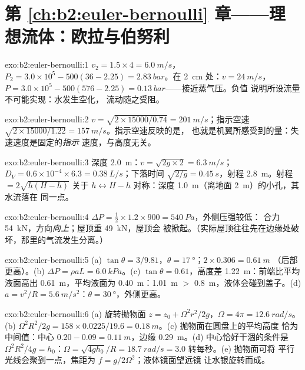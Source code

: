 \section*{第 \ref{ch:b2:euler-bernoulli} 章——理想流体：欧拉与伯努利}

\begin{solution}{exo:b2:euler-bernoulli:1}
$v_2 = 1.5 \times 4 = \qty{6.0}{m/s}$，$P_2 = 3.0 \times 10^5 - 500(36 - 2.25) =
\qty{2.83}{bar}$。在 \qty{2}{cm} 处：$v = \qty{24}{m/s}$，$P = 3.0 \times 10^5 - 500
(576 - 2.25) = \qty{0.13}{bar}$——接近蒸气压。负值
说明所设流量不可能实现：水发生空化，
流动随之受阻。
\end{solution}

\begin{solution}{exo:b2:euler-bernoulli:2}
$v = \sqrt{2 \times 15000/0.74} = \qty{201}{m/s}$；指示空速 $\sqrt{2 \times 15000/
1.22} = \qty{157}{m/s}$。指示空速反映的是，
也就是机翼所感受到的量：失速速度是固定的\emph{指示}
速度，与高度无关。
\end{solution}

\begin{solution}{exo:b2:euler-bernoulli:3}
深度 \qty{2.0}{m}：$v = \sqrt{2g \times 2} = \qty{6.3}{m/s}$；$D_V = 0.6 \times 10^{-4}
\times 6.3 = \qty{0.38}{L/s}$；下落时间 $\sqrt{2/g} = \qty{0.45}{s}$，射程
\qty{2.8}{m}。射程 $= 2\sqrt{h(H - h)}$ 关于 $h \leftrightarrow H -
h$ 对称：深度 \qty{1.0}{m}（离地面 \qty{2}{m}）的小孔，其水流落在
同一点。
\end{solution}

\begin{solution}{exo:b2:euler-bernoulli:4}
$\Delta P = \tfrac12 \times 1.2 \times 900 = \qty{540}{Pa}$，外侧压强较低：
合力 \qty{54}{kN}，方向\emph{向上}；屋顶重 \qty{49}{kN}，屋顶会
被掀起。（实际屋顶往往先在边缘处破坏，那里的气流发生分离。）
\end{solution}

\begin{solution}{exo:b2:euler-bernoulli:5}
(a) $\tan\theta = 3/9.81$，$\theta = \qty{17}{\degree}$；$2 \times 0.306 = \qty{0.61}{m}$
（后部更高）。(b) $\Delta P = \rho aL = \qty{6.0}{kPa}$。(c) $\tan\theta =
0.61$，高度差 \qty{1.22}{m}：前端比平均液面高出
\qty{0.61}{m}，平均液面为 \qty{0.40}{m}：\qty{1.01}{m} $>$ \qty{0.8}{m}，液体会碰到盖子。(d) $a = v^2/R =
\qty{5.6}{m/s^2}$：$\theta = \qty{30}{\degree}$，外侧更高。
\end{solution}

\begin{solution}{exo:b2:euler-bernoulli:6}
(a) 旋转抛物面 $z = z_0 + \Omega^2r^2/2g$，$\Omega = 4\pi = \qty{12.6}{rad/s}$。(b)
$\Omega^2R^2/2g = 158 \times 0.0225/19.6 = \qty{0.18}{m}$。(c) 抛物面在圆盘上的平均高度
恰为中间值：中心 $0.20 - 0.09 = \qty{0.11}{m}$，边缘
\qty{0.29}{m}。(d) 中心恰好干涸的条件是 $\Omega^2R^2/4g = h_0$：$\Omega = \sqrt{4gh_0}/R =
\qty{18.7}{rad/s} = 3.0$ 转每秒。(e) 抛物面可将
平行光线会聚到一点，焦距为 $f = g/2\Omega^2$；液体镜面望远镜
让水银旋转而成。
\end{solution}

